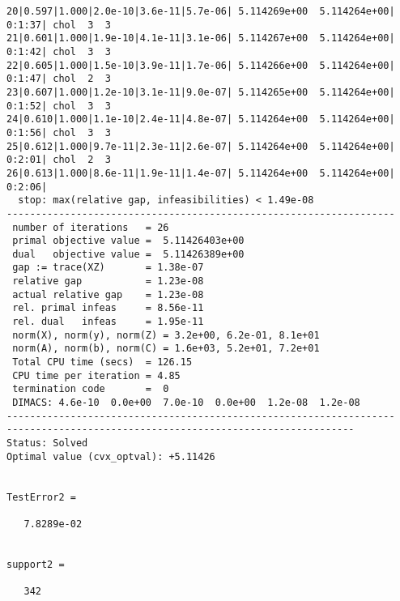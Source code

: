 \documentclass[11pt,a4paper]{report}
\begin{document}
\begin{verbatim}
20|0.597|1.000|2.0e-10|3.6e-11|5.7e-06| 5.114269e+00  5.114264e+00| 0:1:37| chol  3  3 
21|0.601|1.000|1.9e-10|4.1e-11|3.1e-06| 5.114267e+00  5.114264e+00| 0:1:42| chol  3  3 
22|0.605|1.000|1.5e-10|3.9e-11|1.7e-06| 5.114266e+00  5.114264e+00| 0:1:47| chol  2  3 
23|0.607|1.000|1.2e-10|3.1e-11|9.0e-07| 5.114265e+00  5.114264e+00| 0:1:52| chol  3  3 
24|0.610|1.000|1.1e-10|2.4e-11|4.8e-07| 5.114264e+00  5.114264e+00| 0:1:56| chol  3  3 
25|0.612|1.000|9.7e-11|2.3e-11|2.6e-07| 5.114264e+00  5.114264e+00| 0:2:01| chol  2  3 
26|0.613|1.000|8.6e-11|1.9e-11|1.4e-07| 5.114264e+00  5.114264e+00| 0:2:06|
  stop: max(relative gap, infeasibilities) < 1.49e-08
-------------------------------------------------------------------
 number of iterations   = 26
 primal objective value =  5.11426403e+00
 dual   objective value =  5.11426389e+00
 gap := trace(XZ)       = 1.38e-07
 relative gap           = 1.23e-08
 actual relative gap    = 1.23e-08
 rel. primal infeas     = 8.56e-11
 rel. dual   infeas     = 1.95e-11
 norm(X), norm(y), norm(Z) = 3.2e+00, 6.2e-01, 8.1e+01
 norm(A), norm(b), norm(C) = 1.6e+03, 5.2e+01, 7.2e+01
 Total CPU time (secs)  = 126.15  
 CPU time per iteration = 4.85  
 termination code       =  0
 DIMACS: 4.6e-10  0.0e+00  7.0e-10  0.0e+00  1.2e-08  1.2e-08
-------------------------------------------------------------------
------------------------------------------------------------
Status: Solved
Optimal value (cvx_optval): +5.11426
 

TestError2 =

   7.8289e-02


support2 =

   342
   \end{verbatim}

\end{document}

